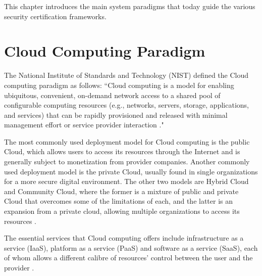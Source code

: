 This chapter introduces the main system paradigms that today guide the various security certification frameworks.

\section{Cloud Computing Paradigm}
The National Institute of Standards and Technology (NIST) defined the Cloud computing paradigm as follows: “Cloud computing is a model for enabling ubiquitous, convenient, on-demand network access to a shared pool of configurable computing resources (e.g., networks, servers, storage, applications, and services) that can be rapidly provisioned and released with minimal management effort or service provider interaction \cite{mell2011nist}."

The most commonly used deployment model for Cloud computing is the public Cloud, which allows users to access its resources through the Internet and is generally subject to monetization from provider companies.
Another commonly used deployment model is the private Cloud, usually found in single organizations for a more secure digital environment.
The other two models are Hybrid Cloud and Community Cloud, where the former is a mixture of public and private Cloud that overcomes some of the limitations of each, and the latter is an expansion from a private cloud, allowing multiple organizations to access its resources \cite{atlam2017integration}.

The essential services that Cloud computing offers include infrastructure as a service (IaaS), platform as a service (PaaS) and software as a service (SaaS), each of whom allows a different calibre of resources' control between the user and the provider \cite{khan2019edge}.


